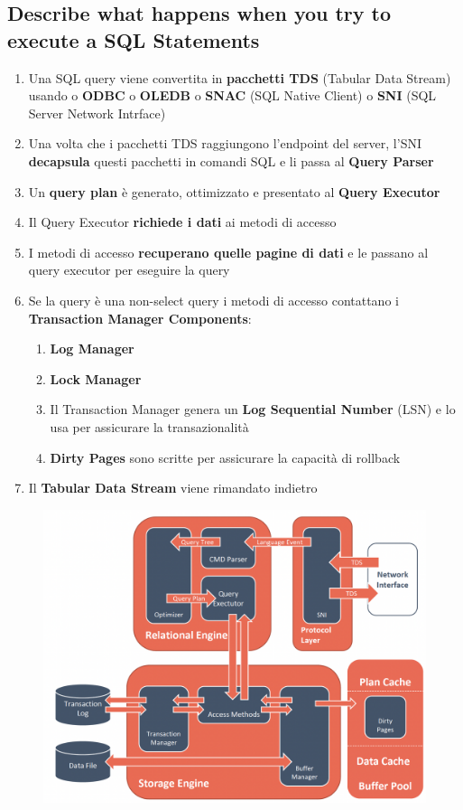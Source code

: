 \documentclass{article}
\begin{document}
\subsection{Describe what happens when you try to execute a SQL Statements}
\begin{enumerate}
    \item Una SQL query viene convertita in \textbf{pacchetti TDS} (Tabular Data Stream) usando o \textbf{ODBC} o \textbf{OLEDB} o \textbf{SNAC} (SQL Native Client) o \textbf{SNI} (SQL Server Network Intrface)
    \item Una volta che i pacchetti TDS raggiungono l'endpoint del server, l'SNI \textbf{decapsula} questi pacchetti in comandi SQL e li passa al \textbf{Query Parser}
    \item Un \textbf{query plan} è generato, ottimizzato e presentato al \textbf{Query Executor}
    \item Il Query Executor \textbf{richiede i dati} ai metodi di accesso
    \item I metodi di accesso \textbf{recuperano quelle pagine di dati} e le passano al query executor per eseguire la query
    \item Se la query è una non-select query i metodi di accesso contattano i \textbf{Transaction Manager Components}:
    \begin{enumerate}
        \item \textbf{Log Manager}
        \item \textbf{Lock Manager}
        \item Il Transaction Manager genera un \textbf{Log Sequential Number} (LSN) e lo usa per assicurare la transazionalità
        \item \textbf{Dirty Pages} sono scritte per assicurare la capacità di rollback
    \end{enumerate}
    \item Il \textbf{Tabular Data Stream} viene rimandato indietro
\end{enumerate}

\begin{figure}[htp]
    \centering
    \includegraphics[width=\linewidth]{fig/SQLstatement.png}
    \label{fig:SQLstatement}
\end{figure}
\end{document}
